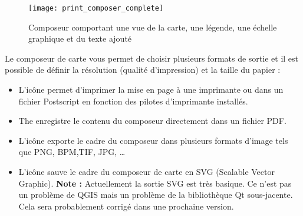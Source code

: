 \begin{figure}[ht]
   \begin{center}
\smallskip
   \texttt{[image: print\_composer\_complete]}
   \caption{Composeur comportant une vue de la carte, une légende, une échelle graphique et du texte ajouté \nixcaption}
   \label{fig:print_composer_complete}
\end{center}
\end{figure}

Le composeur de carte vous permet de choisir plusieurs formats de sortie et il est possible de définir la résolution (qualité d'impression) et la taille du papier :

\begin{itemize}[label=--]
\item L'icône   permet d'imprimer la mise en page à une imprimante ou dans un fichier Postscript en fonction des pilotes d'imprimante installés.
\item The  enregistre le contenu du composeur directement dans un fichier PDF.
\item L'icône  exporte le cadre du composeur dans plusieurs formats d'image tels que PNG, BPM,TIF, JPG, \dots

\item L'icône  sauve le cadre du composeur de carte en SVG (Scalable Vector Graphic). \textbf{Note :} Actuellement la sortie SVG est très basique. Ce n'est pas un problème de QGIS mais un problème de la bibliothèque Qt sous-jacente. Cela sera
probablement corrigé dans une prochaine version. \end{itemize}

